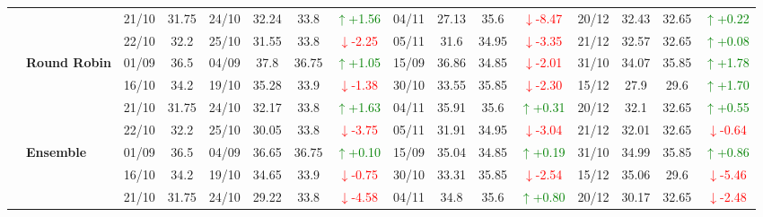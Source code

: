 \documentclass{ieeeaccess}
\begin{document}
{\begin{longtable}{llcc|cccc|cccc|cccc}
&
& 21/10 & 31.75 & 24/10 & 32.24 & 33.8 & \textcolor{green}{\(\uparrow\)+1.56} & 04/11 & 27.13 & 35.6 & \textcolor{red}{\(\downarrow\)-8.47} & 20/12 & 32.43 & 32.65 & \textcolor{green}{\(\uparrow\)+0.22} \\

&
& 22/10 & 32.2 & 25/10 & 31.55 & 33.8 & \textcolor{red}{\(\downarrow\)-2.25} & 05/11 & 31.6 & 34.95 & \textcolor{red}{\(\downarrow\)-3.35} & 21/12 & 32.57 & 32.65 & \textcolor{green}{\(\uparrow\)+0.08} \\
\cmidrule(lr){2-16}


& \textbf{Round Robin}
& 01/09 & 36.5 & 04/09 & 37.8 & 36.75 & \textcolor{green}{\(\uparrow\)+1.05} & 15/09 & 36.86 & 34.85 & \textcolor{red}{\(\downarrow\)-2.01} & 31/10 & 34.07 & 35.85 & \textcolor{green}{\(\uparrow\)+1.78} \\

&
& 16/10 & 34.2 & 19/10 & 35.28 & 33.9 & \textcolor{red}{\(\downarrow\)-1.38} & 30/10 & 33.55 & 35.85 & \textcolor{red}{\(\downarrow\)-2.30} & 15/12 & 27.9 & 29.6 & \textcolor{green}{\(\uparrow\)+1.70} \\

&
& 21/10 & 31.75 & 24/10 & 32.17 & 33.8 & \textcolor{green}{\(\uparrow\)+1.63} & 04/11 & 35.91 & 35.6 & \textcolor{green}{\(\uparrow\)+0.31} & 20/12 & 32.1 & 32.65 & \textcolor{green}{\(\uparrow\)+0.55} \\

&
& 22/10 & 32.2 & 25/10 & 30.05 & 33.8 & \textcolor{red}{\(\downarrow\)-3.75} & 05/11 & 31.91 & 34.95 & \textcolor{red}{\(\downarrow\)-3.04} & 21/12 & 32.01 & 32.65 & \textcolor{red}{\(\downarrow\)-0.64} \\
\cmidrule(lr){2-16}



& \textbf{Ensemble}
& 01/09 & 36.5 & 04/09 & 36.65 & 36.75 & \textcolor{green}{\(\uparrow\)+0.10} & 15/09 & 35.04 & 34.85 & \textcolor{green}{\(\uparrow\)+0.19} & 31/10 & 34.99 & 35.85 & \textcolor{green}{\(\uparrow\)+0.86} \\

&
& 16/10 & 34.2 & 19/10 & 34.65 & 33.9 & \textcolor{red}{\(\downarrow\)-0.75} & 30/10 & 33.31 & 35.85 & \textcolor{red}{\(\downarrow\)-2.54} & 15/12 & 35.06 & 29.6 & \textcolor{red}{\(\downarrow\)-5.46} \\

&
& 21/10 & 31.75 & 24/10 & 29.22 & 33.8 & \textcolor{red}{\(\downarrow\)-4.58} & 04/11 & 34.8 & 35.6 & \textcolor{green}{\(\uparrow\)+0.80} & 20/12 & 30.17 & 32.65 & \textcolor{red}{\(\downarrow\)-2.48} \\


\end{longtable}}
\end{document}
